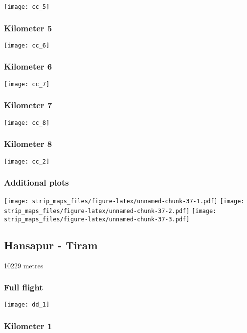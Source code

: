 \documentclass[]{article}
\begin{document}
\texttt{[image: cc\_5]}

\subsubsection{Kilometer 5}\label{kilometer-5-22}

\texttt{[image: cc\_6]}

\subsubsection{Kilometer 6}\label{kilometer-6-17}

\texttt{[image: cc\_7]}

\subsubsection{Kilometer 7}\label{kilometer-7-12}

\texttt{[image: cc\_8]}

\subsubsection{Kilometer 8}\label{kilometer-8-7}

\texttt{[image: cc\_2]}

\subsubsection{Additional plots}\label{additional-plots-28}

\texttt{[image: strip\_maps\_files/figure-latex/unnamed-chunk-37-1.pdf]}
\texttt{[image: strip\_maps\_files/figure-latex/unnamed-chunk-37-2.pdf]}
\texttt{[image: strip\_maps\_files/figure-latex/unnamed-chunk-37-3.pdf]}

\newpage

\subsection{Hansapur - Tiram}\label{hansapur---tiram}

10229 metres

\subsubsection{Full flight}\label{full-flight-29}

\texttt{[image: dd\_1]}

\subsubsection{Kilometer 1}\label{kilometer-1-29}
\end{document}
